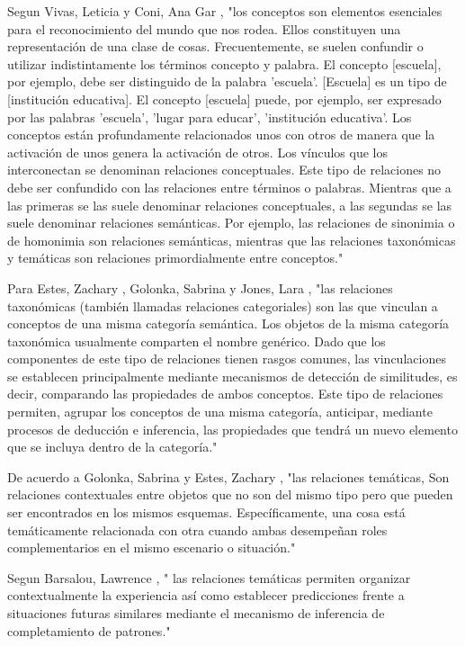 Segun Vivas, Leticia y Coni, Ana Gar  \cite{VIVAS2013}, "los conceptos son elementos esenciales para el reconocimiento del mundo que nos rodea. Ellos constituyen una representación de una clase de cosas. Frecuentemente, se suelen confundir o utilizar indistintamente los términos concepto y palabra. El concepto [escuela],
por ejemplo, debe ser distinguido de la palabra 'escuela'. [Escuela] es un tipo de [institución educativa]. El concepto [escuela] puede,
por ejemplo, ser expresado por las palabras 'escuela', 'lugar para educar', 'institución educativa'. 
Los conceptos están profundamente relacionados unos con otros de manera que la activación de unos genera la 
activación de otros. Los vínculos que los interconectan se denominan relaciones conceptuales. Este tipo de relaciones no debe 
ser confundido con las relaciones entre términos o palabras. Mientras que a las primeras se las suele denominar relaciones conceptuales,
a las segundas se las suele denominar relaciones semánticas. Por ejemplo, las relaciones de sinonimia o de homonimia son
relaciones semánticas, mientras que las relaciones taxonómicas y 
temáticas son relaciones primordialmente entre conceptos."

Para Estes, Zachary , Golonka, Sabrina y Jones, Lara  \cite{estes2011thematic},  "las relaciones taxonómicas (también llamadas relaciones categoriales) son las que vinculan a conceptos de una misma categoría semántica.
Los objetos de la misma categoría taxonómica usualmente comparten el nombre genérico.
Dado que los componentes de este tipo de relaciones tienen rasgos comunes, las vinculaciones se establecen principalmente mediante mecanismos de detección de similitudes, es decir, comparando las propiedades de ambos conceptos.
Este tipo de relaciones permiten, agrupar los conceptos de una misma categoría, anticipar, mediante procesos de deducción e inferencia, las propiedades que tendrá un nuevo elemento que se incluya dentro de la categoría."

De acuerdo a Golonka, Sabrina y Estes, Zachary \cite{golonka2009thematic}, "las relaciones temáticas, Son relaciones contextuales entre objetos que no son del mismo tipo pero que pueden ser encontrados en los mismos esquemas. Específicamente, una cosa está temáticamente relacionada con otra cuando ambas desempeñan roles complementarios en el mismo escenario o situación." 

Segun Barsalou, Lawrence \cite{barsalou2003grounding}, " las relaciones temáticas permiten organizar contextualmente la experiencia así como establecer predicciones frente a situaciones futuras similares mediante el mecanismo de inferencia de completamiento de patrones." 

